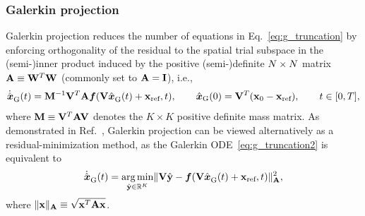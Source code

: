 \documentclass[3p,computermodern,10pt]{elsarticle}
\begin{document}
\subsubsection{Galerkin projection}
Galerkin projection reduces the number of equations in
Eq.~\eqref{eq:g_truncation} by enforcing orthogonality of the 
residual to the spatial trial subspace in the (semi-)inner product induced by the 
positive (semi-)definite $\fomdim\times\fomdim$ matrix $\stweightingMatArg{}\equiv \stweightingMatOneArg{ }^T
\stweightingMatOneArg{ }$ (commonly set to
$\stweightingMatArg{}=\mathbf{I}$), i.e.,
\begin{equation}\label{eq:g_truncation2}
\genstateGalerkinDotArg{}{t} = \massArgnt{n}^{-1} \basisspace^T \stweightingMatArg{n} \velocity(\basisspace
\genstateGalerkinArg{}{t} + \stateIntercept,t), \qquad \genstateGalerkin(0) = \genstateIC, \qquad t \in [0,T],
\end{equation}
where $\massArgnt{ } \equiv \basisspace^T \stweightingMatArg{ } \basisspace$
denotes the $K\times K$ positive definite mass matrix.
As demonstrated in Ref.~\cite{carlberg_lspg_v_galerkin}, Galerkin projection
can be viewed alternatively as a residual-minimization
method, as the Galerkin ODE~\eqref{eq:g_truncation2} is equivalent
to
\begin{equation}\label{eq:GalOptimal}
\genstateGalerkinDotArg{}{t} = \underset{ \genstateyDiscrete \in \RR{\romdim}
	}{\text{arg\,min}} \| \basisspace \hat{\stateyDiscrete} -
	\velocity(\basisspace \genstateGalerkinArg{}{t} + \stateIntercept,t)
	\|_{\stweightingMatArg{n}}^2,
\end{equation}
where $\|\mathbf{x}\|_{\stweightingMatArg{n}}\equiv
\sqrt{\mathbf{x}^T\stweightingMatArg{n}\mathbf{x}}$.
\end{document}
